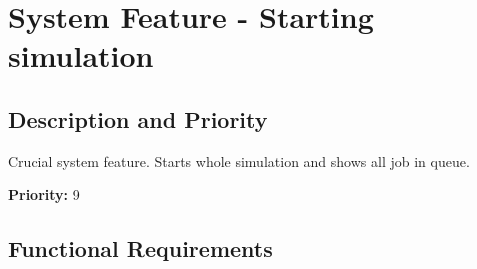 \documentclass{scrreprt}
\begin{document}
\section{System Feature - Starting simulation}


\subsection{Description and Priority}


Crucial system feature. Starts whole simulation and shows all job in queue.

\textbf{Priority:} 9



\subsection{Functional Requirements}
\end{document}
